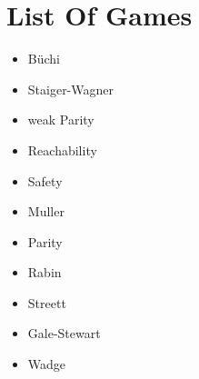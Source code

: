 \documentclass{article}
\begin{document}
\section{List Of Games}
\begin{itemize}
	\item Büchi
	\item Staiger-Wagner
	\item weak Parity
	\item Reachability
	\item Safety
	\item Muller
	\item Parity
	\item Rabin
	\item Streett
	\item Gale-Stewart
	\item Wadge
\end{itemize}
\end{document}
